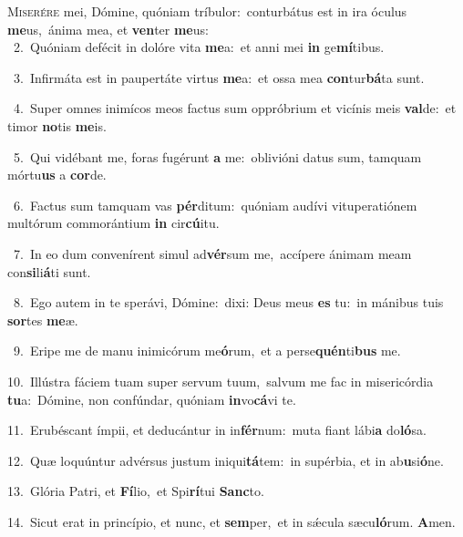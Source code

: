 \lettrine{\initial\textcolor{\initialcolor}{M}}{iserére} mei, Dómine, quóniam tríbulor:~\dagger conturbátus est in ira óculus \textbf{me}\-us,~\star ánima mea, et \textbf{ven}\-ter \textbf{me}\-us:\\
{\numbfont\textcolor{\numbcolor}{~2.}}~Quóniam defécit in dolóre vita \textbf{me}\-a:~\star et anni mei \textbf{in} ge\-\textbf{mí}\-tibus.\par
{\numbfont\textcolor{\numbcolor}{~3.}}~Infirmáta est in paupertáte virtus \textbf{me}\-a:~\star et ossa mea \textbf{con}\-tur\-\textbf{bá}\-ta sunt.\par
{\numbfont\textcolor{\numbcolor}{~4.}}~Super omnes inimícos meos factus sum oppróbrium et vicínis meis \textbf{val}\-de:~\star et timor \textbf{no}\-tis \textbf{me}\-is.\par
{\numbfont\textcolor{\numbcolor}{~5.}}~Qui vidébant me, foras fugérunt \textbf{a} me:~\star oblivióni datus sum, tamquam mórtu\textbf{us} a \textbf{cor}\-de.\par
{\numbfont\textcolor{\numbcolor}{~6.}}~Factus sum tamquam vas \textbf{pér}\-ditum:~\star quóniam audívi vituperatiónem multórum commorántium \textbf{in} cir\-\textbf{cú}\-itu.\par
{\numbfont\textcolor{\numbcolor}{~7.}}~In eo dum convenírent simul ad\-\textbf{vér}\-sum me,~\star accípere ánimam meam con\-\textbf{si}\-li\-\textbf{á}\-ti sunt.\par
{\numbfont\textcolor{\numbcolor}{~8.}}~Ego autem in te sperávi, Dómine:~\dagger dixi: Deus meus \textbf{es} tu:~\star in mánibus tuis \textbf{sor}\-tes \textbf{me}\-æ.\par
{\numbfont\textcolor{\numbcolor}{~9.}}~Eripe me de manu inimicórum me\-\textbf{ó}\-rum,~\star et a perse\-\textbf{quén}\-ti\textbf{bus} me.\par
{\numbfont\textcolor{\numbcolor}{10.}}~Illústra fáciem tuam super servum tuum,~\dagger salvum me fac in misericórdia \textbf{tu}\-a:~\star Dómine, non confúndar, quóniam \textbf{in}\-vo\-\textbf{cá}\-vi te.\par
{\numbfont\textcolor{\numbcolor}{11.}}~Erubéscant ímpii, et deducántur in in\-\textbf{fér}\-num:~\star muta fiant lábi\textbf{a} do\-\textbf{ló}\-sa.\par
{\numbfont\textcolor{\numbcolor}{12.}}~Quæ loquúntur advérsus justum iniqui\-\textbf{tá}\-tem:~\star in supérbia, et in ab\-\textbf{u}\-si\-\textbf{ó}\-ne.\par
{\numbfont\textcolor{\numbcolor}{13.}}~Glória Patri, et \textbf{Fí}\-lio,~\star et Spi\-\textbf{rí}\-tui \textbf{Sanc}\-to.\par
{\numbfont\textcolor{\numbcolor}{14.}}~Sicut erat in princípio, et nunc, et \textbf{sem}\-per,~\star et in sǽcula sæcu\-\textbf{ló}\-rum. \textbf{A}\-men.\par
